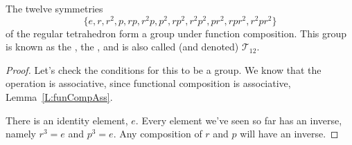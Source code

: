\documentclass{ximera}
\begin{document}
\begin{example}
  The twelve symmetries
  \[
  \{e,r,r^2,p,rp,r^2p,p^2,rp^2,r^2p^2,pr^2,rpr^2,r^2pr^2\}
  \]
  of the regular tetrahedron form a group under function
  composition. This group is known as the , the
  , and is also called (and
  denoted) $\mathcal{T}_{12}$.
  \begin{proof}
    Let's check the conditions for this to be a group. We know that
    the operation is associative, since functional composition is
    associative, Lemma~\ref{L:funCompAss}.

    There is an identity element, $e$. Every element we've seen so far
    has an inverse, namely $r^3 = e$ and $p^3= e$. Any composition of
    $r$ and $p$ will have an inverse.
    

\end{proof}
\end{example}
\end{document}

